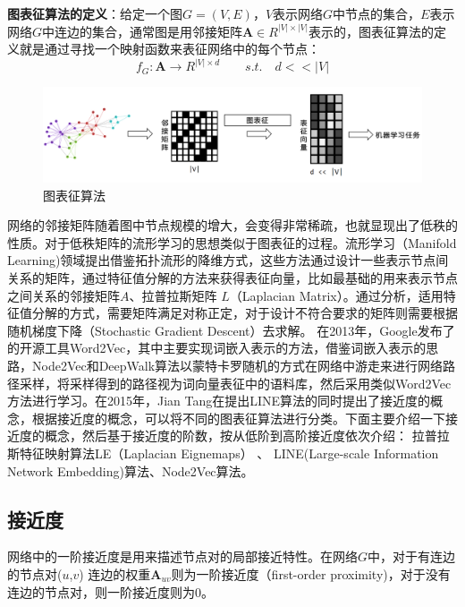 \textbf{图表征算法的定义}：给定一个图$G = (V,E)$，$V$表示网络$G$中节点的集合，$E$表示网络$G$中连边的集合，通常图是用邻接矩阵$\textbf{A} \in R^{|V|\times|V|}$表示的，图表征算法的定义就是通过寻找一个映射函数来表征网络中的每个节点：
\begin{equation}
f_G: \textbf{A}\rightarrow R^{|V| \times d} \qquad s.t.\quad d<<|V|
\end{equation}

\begin{figure}
	\centering
	\includegraphics[width=5.5in]{figures/network_embedding}
	\caption{图表征算法}
\end{figure}


网络的邻接矩阵随着图中节点规模的增大，会变得非常稀疏，也就显现出了低秩的性质。对于低秩矩阵的流形学习的思想类似于图表征的过程。流形学习（Manifold Learning)领域提出借鉴拓扑流形的降维方式，这些方法通过设计一些表示节点间关系的矩阵，通过特征值分解的方法来获得表征向量，比如最基础的用来表示节点之间关系的邻接矩阵$A$、拉普拉斯矩阵 $L$（Laplacian Matrix）。通过分析，适用特征值分解的方式，需要矩阵满足对称正定，对于设计不符合要求的矩阵则需要根据随机梯度下降（Stochastic Gradient Descent）去求解。
在2013年，Google发布了的开源工具Word2Vec\cite{mikolov2013efficient}，其中主要实现词嵌入表示的方法，借鉴词嵌入表示的思路，Node2Vec和DeepWalk算法以蒙特卡罗随机的方式在网络中游走来进行网络路径采样，将采样得到的路径视为词向量表征中的语料库，然后采用类似Word2Vec方法进行学习。在2015年，Jian Tang\cite{tang2015line}在提出LINE算法的同时提出了接近度的概念，根据接近度的概念，可以将不同的图表征算法进行分类。下面主要介绍一下接近度的概念，然后基于接近度的阶数，按从低阶到高阶接近度依次介绍：%
拉普拉斯特征映射算法LE（Laplacian Eignemaps） 、 LINE(Large-scale Information Network Embedding)算法、Node2Vec算法。%
\subsection{接近度}
\label{first_order}
网络中的一阶接近度是用来描述节点对的局部接近特性。在网络$G$中，对于有连边的节点对($u$,$v$)
连边的权重$\textbf{A}_{uv}$则为一阶接近度（first-order proximity)，对于没有连边的节点对，则一阶接近度则为0。

